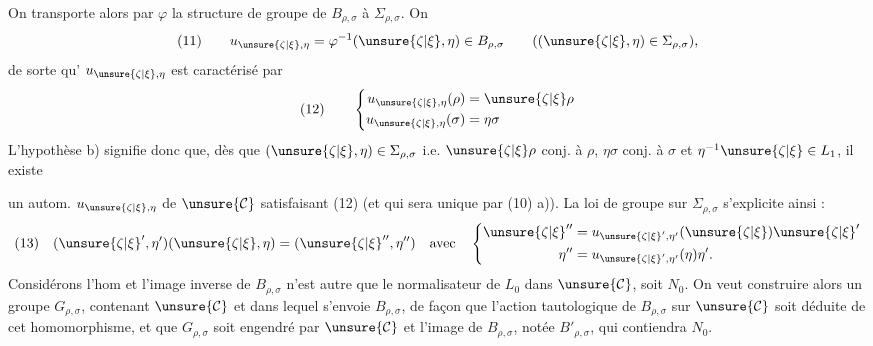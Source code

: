 On transporte alors par $\varphi$ la structure de groupe de $B_{\rho,\sigma}$ à $\Sigma_{\rho,\sigma}$. On 
\[
(11)\qquad u_{\unsure{\zeta|\xi},\eta}=\varphi^{-1}(\unsure{\zeta|\xi},\eta)\in B_{\rho,\sigma}
\qquad((\unsure{\zeta|\xi},\eta)\in\Sigma_{\rho,\sigma}),
\]
de sorte qu' $u_{\unsure{\zeta|\xi},\eta}$ est caractérisé par
\[
(12)\qquad\left\{\begin{aligned}
u_{\unsure{\zeta|\xi},\eta}(\rho)&=\unsure{\zeta|\xi}\rho\\
u_{\unsure{\zeta|\xi},\eta}(\sigma)&=\eta\sigma
\end{aligned}\right.
\]
L'hypothèse b) signifie donc que, dès que $(\unsure{\zeta|\xi},\eta)\in\Sigma_{\rho,\sigma}$ i.e. $\unsure{\zeta|\xi}\rho$ conj. à $\rho$, $\eta\sigma$ conj. à $\sigma$ et $\eta^{-1}\unsure{\zeta|\xi}\in L_1$, il existe

un autom. $u_{\unsure{\zeta|\xi},\eta}$ de $\unsure{\mathcal{C}}$ satisfaisant (12) (et qui sera unique par (10) a)). La loi de groupe sur $\Sigma_{\rho,\sigma}$ s'explicite ainsi :
\[
(13)\quad(\unsure{\zeta|\xi}',\eta')(\unsure{\zeta|\xi},\eta)=(\unsure{\zeta|\xi}'',\eta'')\quad\text{avec}\quad
\left\{\begin{aligned}
\unsure{\zeta|\xi}''&=u_{\unsure{\zeta|\xi}',\eta'}(\unsure{\zeta|\xi})\unsure{\zeta|\xi}'\\
\eta''&=u_{\unsure{\zeta|\xi}',\eta'}(\eta)\eta'.
\end{aligned}\right.
\]
Considérons l'hom 
 
et l'image inverse de $B_{\rho,\sigma}$ n'est autre que le normalisateur de $L_0$ dans $\unsure{\mathcal{C}}$, soit $N_0$. On veut construire alors un groupe $G_{\rho,\sigma}$, contenant $\unsure{\mathcal{C}}$  et dans lequel  s'envoie $B_{\rho,\sigma}$, de façon que l'action tautologique de $B_{\rho,\sigma}$ sur $\unsure{\mathcal{C}}$ soit déduite de cet homomorphisme, et que $G_{\rho,\sigma}$ soit engendré par $\unsure{\mathcal{C}}$ et l'image de $B_{\rho,\sigma}$, notée $B'_{\rho,\sigma}$, qui contiendra  $N_0$.

